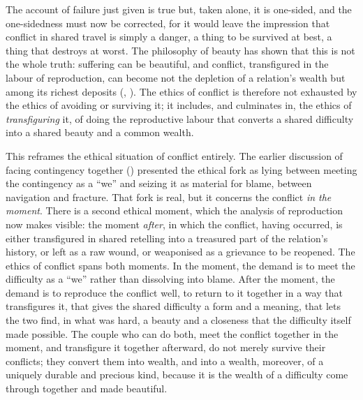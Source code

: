 The account of failure just given is true but, taken alone, it is one-sided, and the one-sidedness must now be corrected, for it would leave the impression that conflict in shared travel is simply a danger, a thing to be survived at best, a thing that destroys at worst. The philosophy of beauty has shown that this is not the whole truth: suffering can be beautiful, and conflict, transfigured in the labour of reproduction, can become not the depletion of a relation's wealth but among its richest deposits (, ). The ethics of conflict is therefore not exhausted by the ethics of avoiding or surviving it; it includes, and culminates in, the ethics of \emph{transfiguring} it, of doing the reproductive labour that converts a shared difficulty into a shared beauty and a common wealth.

This reframes the ethical situation of conflict entirely. The earlier discussion of facing contingency together () presented the ethical fork as lying between meeting the contingency as a ``we'' and seizing it as material for blame, between navigation and fracture. That fork is real, but it concerns the conflict \emph{in the moment}. There is a second ethical moment, which the analysis of reproduction now makes visible: the moment \emph{after}, in which the conflict, having occurred, is either transfigured in shared retelling into a treasured part of the relation's history, or left as a raw wound, or weaponised as a grievance to be reopened. The ethics of conflict spans both moments. In the moment, the demand is to meet the difficulty as a ``we'' rather than dissolving into blame. After the moment, the demand is to reproduce the conflict well, to return to it together in a way that transfigures it, that gives the shared difficulty a form and a meaning, that lets the two find, in what was hard, a beauty and a closeness that the difficulty itself made possible. The couple who can do both, meet the conflict together in the moment, and transfigure it together afterward, do not merely survive their conflicts; they convert them into wealth, and into a wealth, moreover, of a uniquely durable and precious kind, because it is the wealth of a difficulty come through together and made beautiful.

